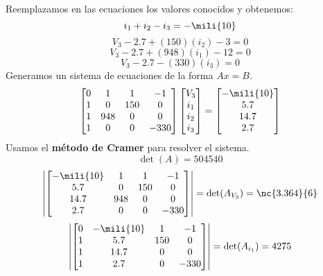 Reemplazamos en las ecuaciones los valores conocidos y obtenemos:
\begin{equation}
i_1+i_2-i_3=-\mili{10}
\end{equation}
\begin{equation}
V_3-2.7+(150)(i_{2})-3= 0
\end{equation}
\begin{equation}
V_3-2.7+(948)(i_{1})-12 = 0
\end{equation}
\begin{equation}
V_3-2.7-(330)(i_{3}) = 0
\end{equation}
Generamos un sistema de ecuaciones de la forma $Ax=B$.
\begin{equation}
\begin{bmatrix}
0 & 1 & 1 & -1\\
1 & 0 & 150 & 0\\
1 & 948 & 0 & 0\\
1 & 0 & 0 & -330
\end{bmatrix}
\begin{bmatrix}
V_3\\
i_1\\
i_2\\
i_3\\
\end{bmatrix}
=
\begin{bmatrix}
-\mili{10}\\
5.7\\
14.7\\
2.7\\
\end{bmatrix}
\end{equation}
Usamos el \textbf{método de Cramer} para resolver el sistema.
\begin{equation}
    \det(A) = 504540
\end{equation}
\begin{equation}
\left| \begin{bmatrix}
-\mili{10} & 1 & 1 & -1\\
5.7 & 0 & 150 & 0\\
14.7 & 948 & 0 & 0\\
2.7 & 0 & 0 & -330
\end{bmatrix}\right|=\det(A_{V_3}) = \nc{3.364}{6}
\end{equation}
\begin{equation}
\left| \begin{bmatrix}
0 & -\mili{10} & 1 & -1\\
1 & 5.7 & 150 & 0\\
1 & 14.7 & 0 & 0\\
1 & 2.7 & 0 & -330
\end{bmatrix}\right|=\det(A_{i_1}) = 4275
\end{equation}
